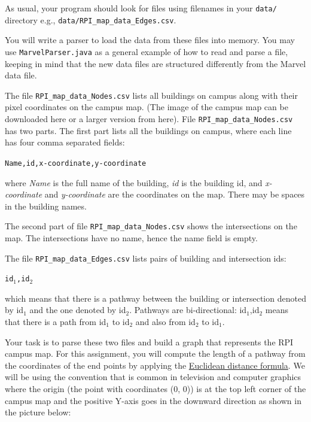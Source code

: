 \documentclass[11pt]{article}
\begin{document}
\noindent As usual, your program should look for files using filenames in your \texttt{data/} directory  e.g., 
\newline
\texttt{data/RPI\_map\_data\_Edges.csv}.

\noindent You will write a parser to load the data from these files into memory. You may use \texttt{MarvelParser.java} as a general example of how to read and parse a file, keeping in mind that the new data files are structured differently from the Marvel data file.

\noindent The file \texttt{RPI\_map\_data\_Nodes.csv} lists all buildings on campus along with their pixel coordinates on the campus map. (The image of the campus map can be downloaded here or a larger version from here).  File \texttt{RPI\_map\_data\_Nodes.csv} has two parts. The first part lists all the buildings on campus, where each line has four comma separated fields:

\noindent \texttt{Name,id,x-coordinate,y-coordinate}

\noindent where \textit{Name} is the full name of the building, \textit{id} is the building id, and \textit{x-coordinate} and \textit{y-coordinate} are the coordinates on the map. There may be spaces in the building names.

\noindent The second part of file \texttt{RPI\_map\_data\_Nodes.csv} shows the intersections on the map. The intersections have no name, hence the name field is empty.

\noindent The file \texttt{RPI\_map\_data\_Edges.csv} lists pairs of building and intersection ids:

\noindent \texttt{id$_1$,id$_2$}

\noindent which means that there is a pathway between the building or intersection denoted by id$_1$ and the one denoted by id$_2$. Pathways are bi-directional: id$_1$,id$_2$ means that there is a path from id$_1$ to id$_2$ and also from id$_2$ to id$_1$.

\noindent Your task is to parse these two files and build a graph that represents the RPI campus map. For this assignment, you will compute the length of a pathway from the coordinates of the end points by applying the \href{https://mathworld.wolfram.com/Distance.html}{Euclidean distance formula}. We will be using the convention that is common in television and computer graphics where the origin (the point with coordinates (0, 0)) is at the top left corner of the campus map and the positive Y-axis goes in the downward direction as shown in the picture below:
\end{document}
